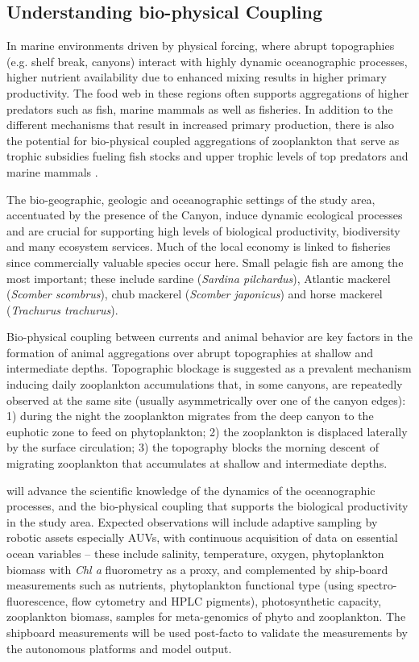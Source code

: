 \subsection{Understanding bio-physical Coupling}


In marine environments driven by physical forcing, where abrupt
topographies (e.g. shelf break, canyons) interact with highly dynamic
oceanographic processes, higher nutrient availability due to enhanced
mixing results in higher primary productivity.  The food web in these
regions often supports aggregations of higher predators such as fish,
marine mammals as well as fisheries. In addition to the different
mechanisms that result in increased primary production, there is also
the potential for bio-physical coupled aggregations of zooplankton
that serve as trophic subsidies fueling fish stocks and upper trophic
levels of top predators and marine mammals \cite{genin04}.

The bio-geographic, geologic and oceanographic settings of the study
area, accentuated by the presence of the \naz Canyon, induce dynamic
ecological processes and are crucial for supporting high levels of
biological productivity, biodiversity and many ecosystem
services. Much of the local economy is linked to fisheries since
commercially valuable species occur here. Small pelagic fish are among
the most important; these include sardine (\emph{Sardina pilchardus}),
Atlantic mackerel (\emph{Scomber scombrus}), chub mackerel
(\emph{Scomber japonicus}) and horse mackerel (\emph{Trachurus
  trachurus}).

Bio-physical coupling between currents and animal behavior are key
factors in the formation of animal aggregations over abrupt
topographies at shallow and intermediate depths. Topographic blockage
is suggested as a prevalent mechanism inducing daily zooplankton
accumulations that, in some canyons, are repeatedly observed at the
same site (usually asymmetrically over one of the canyon edges): 1)
during the night the zooplankton migrates from the deep canyon to the
euphotic zone to feed on phytoplankton; 2) the zooplankton is
displaced laterally by the surface circulation; 3) the topography
blocks the morning descent of migrating zooplankton that accumulates
at shallow and intermediate depths.

\proj will advance the scientific knowledge of the dynamics of the
oceanographic processes, and the bio-physical coupling that supports
the biological productivity in the study area. Expected observations
will include adaptive sampling by robotic assets especially AUVs, with
continuous acquisition of data on essential ocean variables -- these
include salinity, temperature, oxygen, phytoplankton biomass with
\emph{Chl a} fluorometry as a proxy, and complemented by ship-board
measurements such as nutrients, phytoplankton functional type (using
spectro-fluorescence, flow cytometry and HPLC pigments), photosynthetic
capacity, zooplankton biomass, samples for meta-genomics of phyto and
zooplankton.  The shipboard measurements will be used post-facto to
validate the measurements by the autonomous platforms and model
output.

